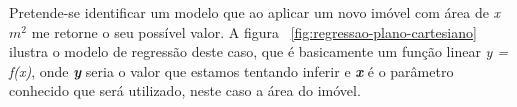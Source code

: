 \begin{table}[h!]
\end{table} 

Pretende-se identificar um modelo que ao aplicar um novo imóvel com área de \textit{x $m^2$} me retorne o seu possível valor. A figura ~\ref{fig:regressao-plano-cartesiano} ilustra 
o modelo de regressão deste caso, que é basicamente um função linear \textit{y = f(x)}, onde \textbf{\textit{y}} seria o valor que estamos tentando inferir e \textbf{\textit{x}} é o parâmetro 
conhecido que será utilizado, neste caso a área do imóvel.

\begin{figure}[ht!]
	\centering
	\Caption{\label{fig:regressao-plano-cartesiano} }	
\end{figure}